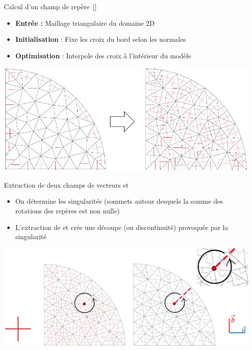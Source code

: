 \begin{frame}{Calcul d'un champ de repère~[\cite{hertzmann_illustrating_2000}]}
    \begin{itemize}
        \item \textbf{Entrée :} Maillage triangulaire du domaine 2D
        \item \textbf{Initialisation} : Fixe les croix du bord selon les normales
        \item \textbf{Optimisation} : Interpole des croix à l’intérieur du modèle
    \end{itemize}
    
    \vspace{1em}
    \centering
    \includegraphics[width=\linewidth]{img/new_images/compute_ff2D.png}
\end{frame}

\begin{frame}{Extraction de deux champs de vecteurs  et }
    \centering
	\begin{itemize}
        \item On détermine les singularités (sommets autour desquels la somme des rotations des repères est non nulle)
        \item L'extraction de  et  crée une découpe (ou discontinuité) provoquée par la singularité
    \end{itemize}
    \includegraphics[width=\linewidth]{img/new_images/ff_to_vf.png}
\end{frame}

